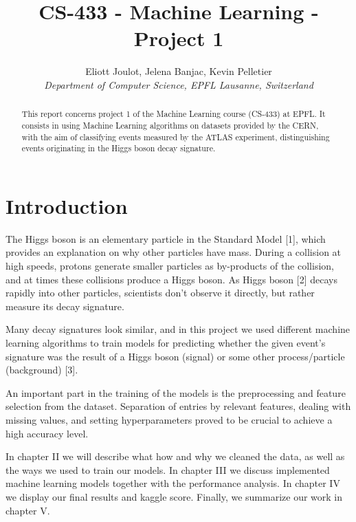 \documentclass[10pt,conference,compsocconf]{IEEEtran}
\begin{document}
\title{CS-433 - Machine Learning - Project 1}

\author{
  Eliott Joulot, Jelena Banjac, Kevin Pelletier\\
  \textit{Department of Computer Science, EPFL Lausanne, Switzerland}
}

\maketitle

\begin{abstract}
This report concerns project 1 of the Machine Learning course (CS-433) at EPFL. It consists in using Machine Learning algorithms on datasets provided by the CERN, with the aim of classifying events measured by the ATLAS experiment, distinguishing events originating in the Higgs boson decay signature.
\end{abstract}


\section{\textbf{Introduction} }

The Higgs boson is an elementary particle in the Standard Model [1], which provides an explanation on why other particles have mass. During a collision at high speeds, protons generate smaller particles as by-products of the collision, and at times these collisions produce a Higgs boson. As Higgs boson [2] decays rapidly into other particles, scientists don't observe it directly, but rather measure its decay signature. 

Many decay signatures look similar, and in this project we used different machine learning algorithms to train models for predicting whether the given event's signature was the result of a Higgs boson (signal) or some other process/particle (background) [3].

An important part in the training of the models is the preprocessing and feature selection from the dataset. Separation of entries by relevant features, dealing with missing values, and setting hyperparameters proved to be crucial to achieve a high accuracy level.

In chapter II we will describe what how and why we cleaned the data, as well as the ways we used to train our models. In chapter III we discuss implemented machine learning models together with the performance analysis. In chapter IV we display our final results and kaggle score. Finally, we summarize our work in chapter V.
\end{document}
